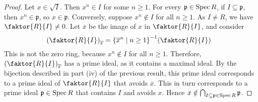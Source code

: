 \begin{proof}
    Let \( x \in \sqrt{I} \).
    Then \( x^n \in I \) for some \( n \geq 1 \).
    For every \( \mathfrak p \in \operatorname{Spec} R \), if \( I \subseteq \mathfrak p \), then \( x^n \in \mathfrak p \), so \( x \in \mathfrak p \).
    Conversely, suppose \( x^n \notin I \) for all \( n \geq 1 \).
    As \( I \neq R \), we have \( \faktor{R}{I} \neq 0 \).
    Let \( \overline x \) be the image of \( x \) in \( \faktor{R}{I} \), and consider
    \[ \qty(\faktor{R}{I})_{\overline x} = \qty{\overline x^n \mid n \geq 1}^{-1} \qty(\faktor{R}{I}) \]
    This is not the zero ring, because \( x^n \notin I \) for all \( n \geq 1 \).
    Therefore, \( \qty(\faktor{R}{I})_{\overline x} \) has a prime ideal, as it contains a maximal ideal.
    By the bijection described in part (iv) of the previous result, this prime ideal corresponds to a prime ideal of \( \faktor{R}{I} \) that avoids \( \overline x \).
    This in turn corresponds to a prime ideal \( \mathfrak p \in \operatorname{Spec} R \) that contains \( I \) and avoids \( x \).
    Hence \( x \notin \bigcap_{I \subseteq \mathfrak p \in \operatorname{Spec} R} \mathfrak p \). 
\end{proof}
